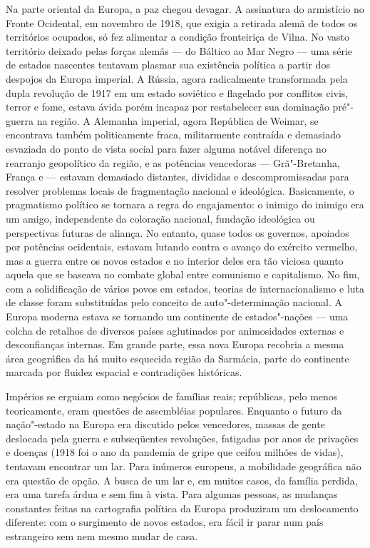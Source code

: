Na parte oriental da Europa, a paz chegou devagar. A assinatura do
armistício no Fronte Ocidental, em novembro de 1918, que exigia a
retirada alemã de todos os territórios ocupados, só fez alimentar a
condição fronteiriça de Vilna. No vasto território deixado pelas forças
alemãs --- do Báltico ao Mar Negro --- uma série de estados nascentes
tentavam plasmar sua existência política a partir dos despojos da Europa
imperial. A Rússia, agora radicalmente transformada pela dupla revolução
de 1917 em um estado soviético e flagelado por conflitos civis, terror e
fome, estava ávida porém incapaz por restabelecer sua dominação
pré"-guerra na região. A Alemanha imperial, agora República de Weimar, se
encontrava também politicamente fraca, militarmente contraída e
demasiado esvaziada do ponto de vista social para fazer alguma notável
diferença no rearranjo geopolítico da região, e as potências vencedoras
--- Grã"-Bretanha, França e  --- estavam demasiado distantes, divididas e
descompromissadas para resolver problemas locais de fragmentação
nacional e ideológica. Basicamente, o pragmatismo político se tornara a
regra do engajamento: o inimigo do inimigo era um amigo, independente da
coloração nacional, fundação ideológica ou perspectivas futuras de
aliança. No entanto, quase todos os governos, apoiados por potências
ocidentais, estavam lutando contra o avanço do exército vermelho, mas a
guerra entre os novos estados e no interior deles era tão viciosa quanto
aquela que se baseava no combate global entre comunismo e capitalismo.
No fim, com a solidificação de vários povos em estados, teorias de
internacionalismo e luta de classe foram substituídas pelo conceito de
auto"-determinação nacional. A Europa moderna estava se tornando um
continente de estados"-nações --- uma colcha de retalhos de diversos países
aglutinados por animosidades externas e desconfianças internas. Em
grande parte, essa nova Europa recobria a mesma área geográfica da há
muito esquecida região da Sarmácia, parte do continente marcada por
fluidez espacial e contradições históricas.

Impérios se erguiam como negócios de famílias reais; repúblicas, pelo
menos teoricamente, eram questões de assembléias populares. Enquanto o
futuro da nação"-estado na Europa era discutido pelos vencedores, massas
de gente deslocada pela guerra e subseqüentes revoluções, fatigadas por
anos de privações e doenças (1918 foi o ano da pandemia de gripe que
ceifou milhões de vidas), tentavam encontrar um lar. Para inúmeros
europeus, a mobilidade geográfica não era questão de opção. A busca de
um lar e, em muitos casos, da família perdida, era uma tarefa árdua e
sem fim à vista. Para algumas pessoas, as mudanças constantes feitas na
cartografia política da Europa produziram um deslocamento diferente: com
o surgimento de novos estados, era fácil ir parar num país estrangeiro
sem nem mesmo mudar de casa.

